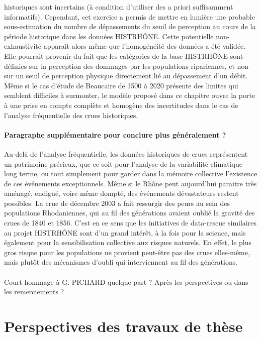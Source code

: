 historiques sont incertains (à condition d'utiliser des a priori suffisamment informatifs). Cependant, cet exercice a permis de mettre en lumière une probable sous-estimation du nombre de dépassements du seuil de perception au cours de la période historique dans les données HISTRHÔNE. Cette potentielle non-exhaustivité apparait alors même que l'homogénéité des données a été validée. Elle pourrait provenir du fait que les catégories de la base HISTRHÔNE sont définies sur la perception des dommages par les populations ripariennes, et non sur un seuil de perception physique directement lié au dépassement d'un débit. Même si le cas d'étude de Beaucaire de 1500 à 2020 présente des limites qui semblent difficiles à surmonter, le modèle proposé dans ce chapitre ouvre la porte à une prise en compte complète et homogène des incertitudes dans le cas de l'analyse fréquentielle des crues historiques. 
	
	\paragraph{ Paragraphe supplémentaire pour conclure plus généralement ?}
	Au-delà de l'analyse fréquentielle, les données historiques de crues représentent un patrimoine précieux, que ce soit pour l'analyse de la variabilité climatique long terme, ou tout simplement pour garder dans la mémoire collective l'existence de ces événements exceptionnels. Même si le Rhône peut aujourd'hui paraitre très aménagé, endigué, voire même dompté, des événements dévastateurs restent possibles. La crue de décembre 2003 a fait ressurgir des peurs au sein des populations Rhodaniennes, qui au fil des générations avaient oublié la gravité des crues de 1840 et 1856. C'est en ce sens que les initiatives de data-rescue similaires au projet HISTRHÔNE sont d'un grand intérêt, à la fois pour la science, mais également pour la sensibilisation collective aux risques naturels. En effet, le plus gros risque pour les populations ne provient peut-être pas des crues elles-même, mais plutôt des mécanismes d'oubli qui interviennent au fil des générations.
	
	\paragraph{} Court hommage à G. PICHARD quelque part ? Après les perspectives ou dans les remerciements ?
	
	\section{Perspectives des travaux de thèse}
	
